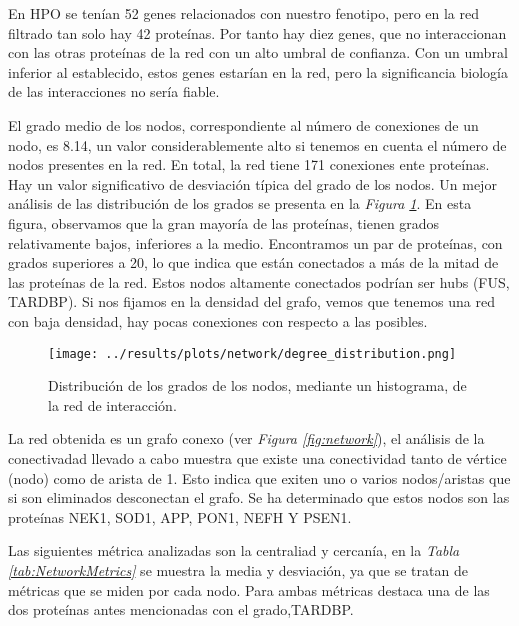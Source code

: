 En HPO se tenían 52 genes relacionados con nuestro fenotipo, pero en la red filtrado tan solo hay 42 proteínas. 
Por tanto hay diez genes, que no interaccionan con las otras proteínas de la red con un alto umbral de confianza. 
Con un umbral inferior al establecido,  estos genes estarían en la red, pero la significancia biología de las interacciones no sería fiable.

El grado medio de los nodos, correspondiente al número de conexiones de un nodo, es 8.14, un valor considerablemente alto si tenemos en cuenta el número de nodos presentes en la red. En total, la red tiene 171 conexiones ente proteínas.
Hay un valor significativo de desviación típica del grado de los nodos. Un mejor análisis de las distribución de los grados se presenta en la \textit{Figura \ref{fig:degree}}. 
En esta figura, observamos que la gran mayoría de las proteínas, tienen grados relativamente bajos, inferiores a la medio. Encontramos un par de proteínas, con grados superiores a 20, lo que indica que están conectados a más de la mitad de las proteínas de la red.
Estos nodos altamente conectados podrían ser hubs (FUS, TARDBP). %
Si nos fijamos en la densidad del grafo, vemos que tenemos una red con baja densidad, hay pocas conexiones con respecto a las posibles.


\begin{figure}[h]
	\centering
	\texttt{[image: ../results/plots/network/degree\_distribution.png]}
	\caption{Distribución de los grados de los nodos, mediante un histograma, de la red de interacción.}
	\label{fig:degree}
\end{figure}

La red obtenida es un grafo conexo (ver \textit{Figura \ref{fig:network}}), el análisis de la conectivadad llevado a cabo muestra que existe una conectividad tanto de vértice (nodo) como de arista de 1.
Esto indica que exiten uno o varios nodos/aristas que si son eliminados desconectan el grafo. Se ha determinado que estos nodos son las proteínas NEK1, SOD1, APP, PON1, NEFH Y PSEN1.

Las siguientes métrica analizadas son la centraliad y cercanía, en la \textit{Tabla \ref{tab:NetworkMetrics}} se muestra la media y desviación, 
ya que se tratan de métricas que se miden por cada nodo. Para ambas métricas destaca una de las dos proteínas antes mencionadas con el grado,TARDBP.

